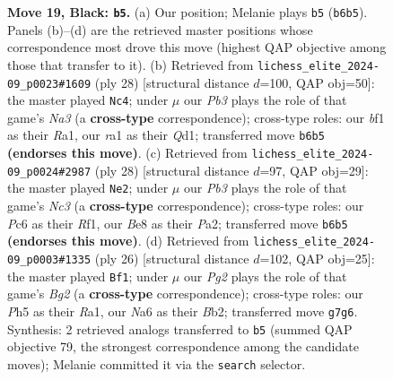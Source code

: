 \documentclass[11pt]{article}
\begin{document}
\begin{figure}[p]
\caption{\textbf{Move 19, Black: \texttt{b5}.} (a) Our position; Melanie plays \texttt{b5} (\texttt{b6b5}). Panels (b)--(d) are the retrieved master positions whose correspondence most drove this move (highest QAP objective among those that transfer to it). (b) Retrieved from \texttt{lichess\_elite\_2024-09\_p0023\#1609} (ply 28) [structural distance $d$=100, QAP obj=50]: the master played \texttt{Nc4}; under $\mu$ our \emph{Pb3} plays the role of that game's \emph{Na3} (a \textbf{cross-type} correspondence); cross-type roles: our \emph{b}f1 as their \emph{R}a1, our \emph{r}a1 as their \emph{Q}d1; transferred move \texttt{b6b5} \textbf{(endorses this move)}. (c) Retrieved from \texttt{lichess\_elite\_2024-09\_p0024\#2987} (ply 28) [structural distance $d$=97, QAP obj=29]: the master played \texttt{Ne2}; under $\mu$ our \emph{Pb3} plays the role of that game's \emph{Nc3} (a \textbf{cross-type} correspondence); cross-type roles: our \emph{P}c6 as their \emph{R}f1, our \emph{B}e8 as their \emph{P}a2; transferred move \texttt{b6b5} \textbf{(endorses this move)}. (d) Retrieved from \texttt{lichess\_elite\_2024-09\_p0003\#1335} (ply 26) [structural distance $d$=102, QAP obj=25]: the master played \texttt{Bf1}; under $\mu$ our \emph{Pg2} plays the role of that game's \emph{Bg2} (a \textbf{cross-type} correspondence); cross-type roles: our \emph{P}h5 as their \emph{R}a1, our \emph{N}a6 as their \emph{B}b2; transferred move \texttt{g7g6}. Synthesis: 2 retrieved analogs transferred to \texttt{b5} (summed QAP objective 79, the strongest correspondence among the candidate moves); Melanie committed it via the \texttt{search} selector.}
\label{fig:thought-m37}
\end{figure}

\clearpage
\end{document}
